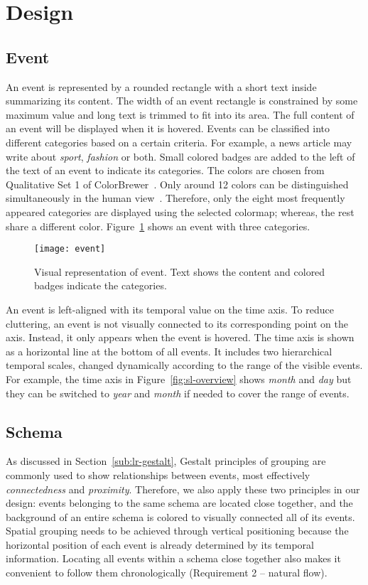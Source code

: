 \section{Design}

\subsection{Event}
An event is represented by a rounded rectangle with a short text inside summarizing its content. The width of an event rectangle is constrained by some maximum value and long text is trimmed to fit into its area. The full content of an event will be displayed when it is hovered. Events can be classified into different categories based on a certain criteria. For example, a news article may write about \emph{sport}, \emph{fashion} or both. Small colored badges are added to the left of the text of an event to indicate its categories. The colors are chosen from Qualitative Set 1 of  ColorBrewer~\cite{Harrower2003}. Only around 12 colors can be distinguished simultaneously in the human view~\cite{Munzner2014}. Therefore, only the eight most frequently appeared categories are displayed using the selected colormap; whereas, the rest share a different color. Figure~\ref{fig:event} shows an event with three categories.

\begin{figure}[!htb]
\centering
\texttt{[image: event]}
\caption{Visual representation of event. Text shows the content and colored badges indicate the categories.}
\label{fig:event}
\end{figure}

An event is left-aligned with its temporal value on the time axis. To reduce cluttering, an event is not visually connected to its corresponding point on the axis. Instead, it only appears when the event is hovered. The time axis is shown as a horizontal line at the bottom of all events. It includes two hierarchical temporal scales, changed dynamically according to the range of the visible events. For example, the time axis in Figure~\ref{fig:sl-overview} shows \emph{month} and \emph{day} but they can be switched to \emph{year} and \emph{month} if needed to cover the range of events.

\subsection{Schema}
\label{sub:schema}
As discussed in Section~\ref{sub:lr-gestalt}, Gestalt principles of grouping are commonly used to show relationships between events, most effectively \emph{connectedness} and \emph{proximity}. Therefore, we also apply these two principles in our design: events belonging to the same schema are located close together, and the background of an entire schema is colored to visually connected all of its events. Spatial grouping needs to be achieved through vertical positioning because the horizontal position of each event is already determined by its temporal information. Locating all events within a schema close together also makes it convenient to follow them chronologically (Requirement 2 -- natural flow).

